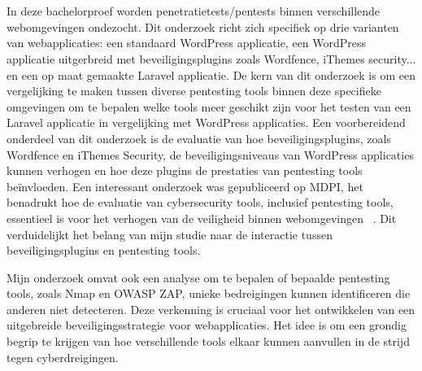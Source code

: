 \chapter{}%
\label{ch:stand-van-zaken}


\section{}
\label{sec:uitleg-onderwerp}
In deze bachelorproef worden penetratietests/pentests binnen verschillende webomgevingen ondezocht. Dit onderzoek richt zich 
specifiek op drie varianten van webapplicaties: een standaard WordPress applicatie, een WordPress applicatie uitgerbreid met beveiligingsplugins zoals Wordfence, 
iThemes security... en een op maat gemaakte Laravel applicatie. De kern van dit onderzoek is om een vergelijking te maken tussen diverse pentesting 
tools binnen deze specifieke omgevingen om te bepalen welke tools meer geschikt zijn voor het testen van een Laravel applicatie in vergelijking met WordPress applicaties.
Een voorbereidend onderdeel van dit onderzoek is de evaluatie van hoe beveiligingsplugins, zoals Wordfence en iThemes Security, de beveiligingsniveaus van WordPress applicaties 
kunnen verhogen en hoe deze plugins de prestaties van pentesting tools beïnvloeden. Een interessant onderzoek was gepubliceerd op MDPI, het benadrukt hoe de evaluatie van 
cybersecurity tools, inclusief pentesting tools, essentieel is voor het verhogen van de veiligheid binnen webomgevingen ~\autocite{Albahar2022}. 
Dit verduidelijkt het belang van mijn studie naar de interactie tussen beveiligingsplugins en pentesting tools.

Mijn onderzoek omvat ook een analyse om te bepalen of bepaalde pentesting tools, zoals Nmap en OWASP ZAP, unieke bedreigingen kunnen identificeren 
die anderen niet detecteren. Deze verkenning is cruciaal voor het ontwikkelen van een uitgebreide beveiligingsstrategie voor webapplicaties. Het idee is om een 
grondig begrip te krijgen van hoe verschillende tools elkaar kunnen aanvullen in de strijd tegen cyberdreigingen.

